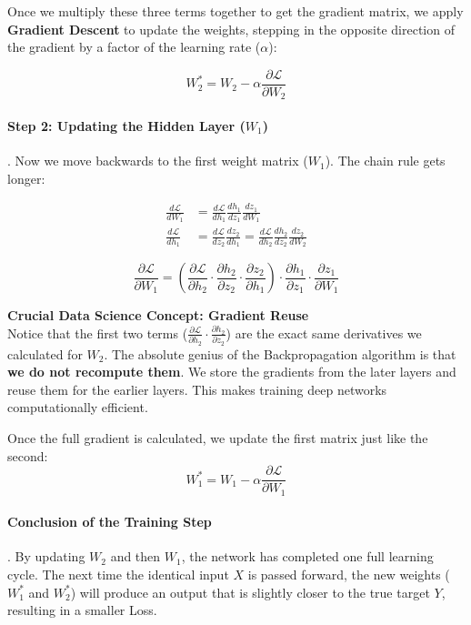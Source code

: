 \documentclass[11pt]{article}
\theoremstyle{smallexample}
\begin{document}
Once we multiply these three terms together to get the gradient matrix, we apply \textbf{Gradient Descent} to update the weights, stepping in the opposite direction of the gradient by a factor of the learning rate ($\alpha$):

\[
W_2^{*} = W_2 - \alpha \frac{\partial \mathcal{L}}{\partial W_2}
\]

\paragraph*{Step 2: Updating the Hidden Layer ($W_1$)}.
Now we move backwards to the first weight matrix ($W_1$). The chain rule gets longer:


\begin{align*}
\frac{d\mathcal{L}}{dW_1}
&=
\frac{d\mathcal{L}}{dh_1}
\frac{dh_1}{dz_1}
\frac{dz_1}{dW_1}
\\[8pt]
\frac{d\mathcal{L}}{dh_1}
&=
\frac{d\mathcal{L}}{dz_2}
\frac{dz_2}{dh_1}
=
\frac{d\mathcal{L}}{dh_2}
\frac{dh_2}{dz_2}
\frac{dz_2}{dW_2}
\end{align*}


\[
\frac{\partial \mathcal{L}}{\partial W_1} = \left( \frac{\partial \mathcal{L}}{\partial h_2} \cdot \frac{\partial h_2}{\partial z_2} \cdot \frac{\partial z_2}{\partial h_1} \right) \cdot \frac{\partial h_1}{\partial z_1} \cdot \frac{\partial z_1}{\partial W_1}
\]

\vspace{0.25cm}
\textbf{Crucial Data Science Concept: Gradient Reuse}\\
Notice that the first two terms ($\frac{\partial \mathcal{L}}{\partial h_2} \cdot \frac{\partial h_2}{\partial z_2}$) are the exact same derivatives we calculated for $W_2$. The absolute genius of the Backpropagation algorithm is that \textbf{we do not recompute them}. We store the gradients from the later layers and reuse them for the earlier layers. This makes training deep networks computationally efficient.

Once the full gradient is calculated, we update the first matrix just like the second:
\[
W_1^{*} = W_1 - \alpha \frac{\partial \mathcal{L}}{\partial W_1}
\]

\paragraph*{Conclusion of the Training Step}.
By updating $W_2$ and then $W_1$, the network has completed one full learning cycle. The next time the identical input $X$ is passed forward, the new weights ($W_1^*$ and $W_2^*$) will produce an output that is slightly closer to the true target $Y$, resulting in a smaller Loss.
\end{document}
